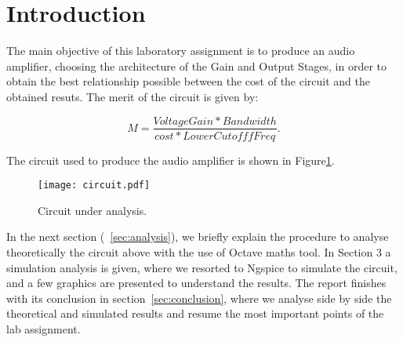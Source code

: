 \section{Introduction}
\label{sec:introduction}

\par The main objective of this laboratory assignment is to produce an audio amplifier, choosing the architecture of the Gain and Output Stages, in order to obtain the best relationship possible between the cost of the circuit and the obtained resuts. The merit of the circuit is given by:

\begin{equation}
  M = \frac {Voltage Gain * Bandwidth}{cost * Lower Cutofff Freq}.
  \label{eq:merit}
\end{equation}


\par The circuit used to produce the audio amplifier is shown in Figure\ref{fig:circuit}.

\begin{figure}[h] \centering
\texttt{[image: circuit.pdf]}
\caption{Circuit under analysis.}
\label{fig:circuit}
\end{figure}


\par In the next section (~\ref{sec:analysis}), we briefly explain the procedure to analyse theoretically the circuit above with the use of Octave maths tool. In Section 3 a simulation analysis is given, where we resorted to Ngspice to simulate the circuit, and a few graphics are presented to understand the results. The report finishes with its conclusion in section~\ref{sec:conclusion}, where we analyse side by side the theoretical and simulated results and resume the most important points of the lab assignment.

\newpage

